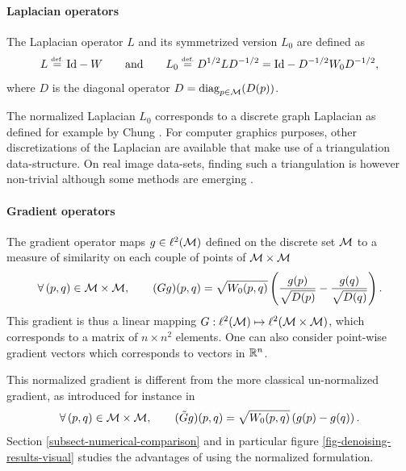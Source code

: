 \documentclass[final]{siamltex}
\begin{document}
\paragraph{Laplacian operators}

The Laplacian operator $L$ and its symmetrized version $L_0$ are defined as 
\begin{equation}
	\label{eq-defn-laplacian}
	L \eqdef \Id - W \qqandqq 
	L_0 \eqdef D^{1/2} L D^{-1/2} = \Id - D^{-1/2} W_0 D^{-1/2},
\end{equation} 
where $D$ is the diagonal operator $D = \diag_{p \in \Mm}(D(p))$. 

The normalized Laplacian $L_0$ corresponds to a discrete graph Laplacian as defined for example by Chung \cite{chung-spectral-graph}. For computer graphics purposes, other discretizations of the Laplacian are available \cite{polthier-computational,xu-discrete-laplacian} that make use of a triangulation data-structure. On real image data-sets, finding such a triangulation is however non-trivial although some methods are emerging \cite{carlsson-topological}. 


\paragraph{Gradient operators}

The gradient operator maps $g \in \ell^2(\mathcal{M})$ defined on the discrete set $\mathcal{M}$ to a measure of similarity on each couple of points of $\mathcal{M} \times \mathcal{M}$
\begin{equation}
	\label{eq-dfn-gradient}
	\foralls (p,q) \in \Mm \times \Mm, \qquad
	(G g)(p,q) = \sqrt{W_0(p,q)} \pa{ \frac{g(p)}{\sqrt{D(p)}}-\frac{g(q)}{\sqrt{D(q)}}}.
\end{equation}
This gradient is thus a linear mapping $G : \ell^2(\mathcal{M}) \mapsto \ell^2(\mathcal{M} \times \mathcal{M})$, which corresponds to a matrix of $n \times n^2$ elements. One can also consider point-wise gradient vectors
which corresponds to vectors in $\mathbb{R}^n$.

This normalized gradient is different from the more classical un-normalized gradient, as introduced for instance in \cite{gilboa-nonlocal-segmentation,gilboa-nonlocal-functionals}
\begin{equation}
	\label{eq-dfn-gradient-unnormalized}
	\foralls (p,q) \in \Mm \times \Mm, \qquad
	(\tilde G g)(p,q) = \sqrt{W_0(p,q)} \pa{ g(p)-g(q) }. 	
\end{equation}
Section \ref{subsect-numerical-comparison} and in particular figure \ref{fig-denoising-results-visual} studies the advantages of using the normalized formulation.
\end{document}
